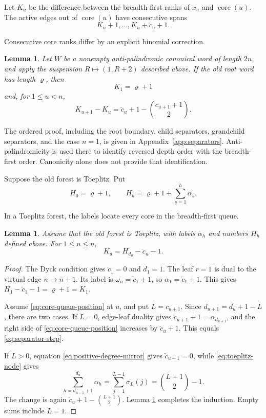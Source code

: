 \documentclass[11pt]{article}
\newtheorem{lemma}[theorem]{Lemma}
\theoremstyle{definition}
\theoremstyle{remark}
\begin{document}
Let \(K_u\) be the difference between the breadth-first ranks of \(x_u\) and
\(\operatorname{core}(u)\).  The active edges out of \(\operatorname{core}(u)\) have consecutive spans
\[
 K_u+1,\ldots,K_u+\check c_u+1.
\]

Consecutive core ranks differ by an explicit binomial correction.
\begin{lemma}
\label{lem:separators}
Let \(W\) be a nonempty anti-palindromic canonical word of length \(2n\), and apply the
suspension \(R\mapsto(1,R+2)\) described above.  If the old root word has
length \(\varrho\), then
\begin{equation*}
 K_1=\varrho+1
\end{equation*}
and, for \(1\leq u<n\),
\begin{equation}
\label{eq:separator-step}
 K_{u+1}-K_u
 =\check c_u+1-\binom{c_{u+1}+1}{2}.
\end{equation}
\end{lemma}

The ordered proof, including the root boundary, child separators,
grandchild separators, and the case \(n=1\), is given in
Appendix~\ref{app:separators}.
Anti-palindromicity is used there to identify reversed depth order with the
breadth-first order.  Canonicity alone does not provide that identification.

Suppose the old forest is Toeplitz.  Put
\begin{equation*}
 H_0=\varrho+1,
 \qquad H_h=\varrho+1+\sum_{s=1}^h\alpha_s.
\end{equation*}

In a Toeplitz forest, the labels locate every core in the breadth-first queue.
\begin{lemma}
\label{lem:core-queue}
Assume that the old forest is Toeplitz, with labels \(\alpha_h\) and numbers
\(H_h\) defined above.  For \(1\leq u\leq n\),
\begin{equation}
\label{eq:core-queue-position}
 K_u=H_{d_u}-\check c_u-1.
\end{equation}
\end{lemma}

\begin{proof}
The Dyck condition gives \(c_1=0\) and \(d_1=1\).  The leaf \(r=1\) is dual
to the virtual edge \(n\to n+1\).  Its label is
\(\omega_n=\check c_1+1\), so \(\alpha_1=\check c_1+1\).  This gives
\(H_1-\check c_1-1=\varrho+1=K_1\).

Assume \eqref{eq:core-queue-position} at \(u\), and put \(L=c_{u+1}\).
Since \(d_{u+1}=d_u+1-L\), there are two cases.  If \(L=0\), edge-leaf
duality gives \(\check c_{u+1}+1=\alpha_{d_{u+1}}\), and the right side of
\eqref{eq:core-queue-position} increases by \(\check c_u+1\).  This equals
\eqref{eq:separator-step}.

If \(L>0\), equation \eqref{eq:positive-degree-mirror} gives
\(\check c_{u+1}=0\), while \eqref{eq:toeplitz-node} gives
\[
 \sum_{h=d_{u+1}+1}^{d_u}\alpha_h
 =\sum_{j=1}^{L-1}\sigma_L(j)
 =\binom{L+1}{2}-1.
\]
The change is again \(\check c_u+1-\binom{L+1}{2}\).  Lemma
\ref{lem:separators} completes the induction.  Empty sums include \(L=1\).
\end{proof}
\end{document}
